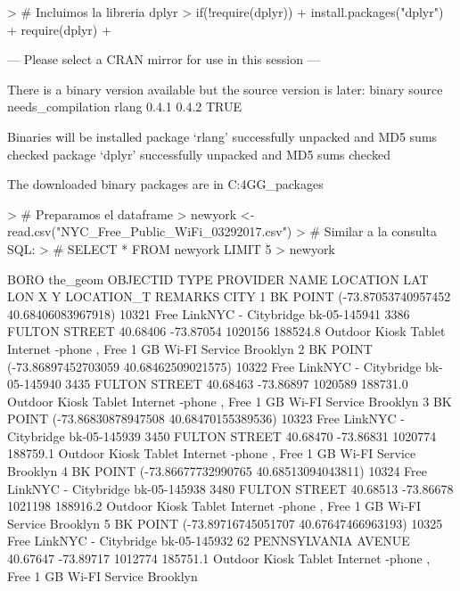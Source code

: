 \documentclass [a4paper] {article}
\begin{document}
\begin{footnotesize}
\begin{Schunk}
\begin{Sinput}
> # Incluimos la libreria dplyr
> if(!require(dplyr)){
+   install.packages("dplyr")
+   require(dplyr)
+ }
\end{Sinput}
\begin{Soutput}
--- Please select a CRAN mirror for use in this session ---

  There is a binary version available but the source version is later:
      binary source needs_compilation
rlang  0.4.1  0.4.2              TRUE

  Binaries will be installed
package ‘rlang’ successfully unpacked and MD5 sums checked
package ‘dplyr’ successfully unpacked and MD5 sums checked

The downloaded binary packages are in
	C:\Users\solol\AppData\Local\Temp\RtmpCgG4GG\downloaded_packages
\end{Soutput}
\begin{Sinput}
> # Preparamos el dataframe
> newyork <- read.csv("NYC_Free_Public_WiFi_03292017.csv")
> # Similar a la consulta SQL:
> # SELECT * FROM newyork LIMIT 5
> newyork %>% head(5)
\end{Sinput}
\begin{Soutput}
  BORO                                     the_geom OBJECTID TYPE             PROVIDER         NAME               LOCATION      LAT       LON       X        Y    LOCATION_T                                          REMARKS     CITY
1   BK POINT (-73.87053740957452 40.68406083967918)    10321 Free LinkNYC - Citybridge bk-05-145941     3386 FULTON STREET 40.68406 -73.87054 1020156 188524.8 Outdoor Kiosk Tablet Internet -phone , Free 1 GB Wi-FI Service Brooklyn
2   BK POINT (-73.86897452703059 40.68462509021575)    10322 Free LinkNYC - Citybridge bk-05-145940     3435 FULTON STREET 40.68463 -73.86897 1020589 188731.0 Outdoor Kiosk Tablet Internet -phone , Free 1 GB Wi-FI Service Brooklyn
3   BK POINT (-73.86830878947508 40.68470155389536)    10323 Free LinkNYC - Citybridge bk-05-145939     3450 FULTON STREET 40.68470 -73.86831 1020774 188759.1 Outdoor Kiosk Tablet Internet -phone , Free 1 GB Wi-FI Service Brooklyn
4   BK POINT (-73.86677732990765 40.68513094043811)    10324 Free LinkNYC - Citybridge bk-05-145938     3480 FULTON STREET 40.68513 -73.86678 1021198 188916.2 Outdoor Kiosk Tablet Internet -phone , Free 1 GB Wi-FI Service Brooklyn
5   BK POINT (-73.89716745051707 40.67647466963193)    10325 Free LinkNYC - Citybridge bk-05-145932 62 PENNSYLVANIA AVENUE 40.67647 -73.89717 1012774 185751.1 Outdoor Kiosk Tablet Internet -phone , Free 1 GB Wi-FI Service Brooklyn

\end{Soutput}
\end{Schunk}
\end{footnotesize}
\end{document}

